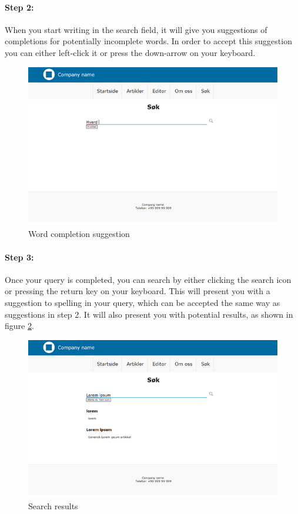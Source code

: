 \paragraph{Step 2:} When you start writing in the search field, it will give you suggestions of completions for potentially incomplete words. In order to accept this suggestion you can either left-click it or press the down-arrow on your keyboard. 

\begin{figure}[H]
    \centering
    \includegraphics[scale=0.70]{fig/userManual/8}
    \caption{Word completion suggestion}
    \label{fig:manual8}
\end{figure}

\paragraph{Step 3:} Once your query is completed, you can search by either clicking the search icon or pressing the return key on your keyboard. This will present you with a suggestion to spelling in your query, which can be accepted the same way as suggestions in step 2. It will also present you with potential results, as shown in figure \ref{fig:manual9}.

\begin{figure}[H]
    \centering
    \includegraphics[scale=0.70]{fig/userManual/9}
    \caption{Search results}
    \label{fig:manual9}
\end{figure}


